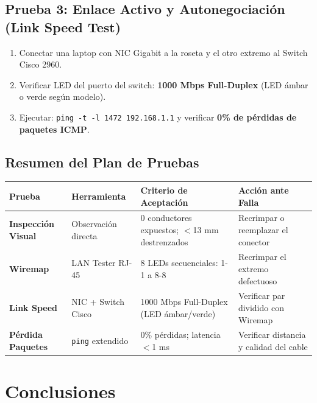 \documentclass[12pt,a4paper]{article}
\begin{document}
\subsection{Prueba 3: Enlace Activo y Autonegociación (Link Speed Test)}
\begin{enumerate}[leftmargin=1.8em,itemsep=3pt]
  \item Conectar una laptop con NIC Gigabit a la roseta y el otro extremo al Switch Cisco 2960.
  \item Verificar LED del puerto del switch: \textbf{1000 Mbps Full-Duplex} (LED ámbar o verde según modelo).
  \item Ejecutar: \texttt{ping -t -l 1472 192.168.1.1} y verificar \textbf{0\% de pérdidas de paquetes ICMP}.
\end{enumerate}

\subsection{Resumen del Plan de Pruebas}

\begin{tabularx}{\textwidth}{>{\bfseries\small}p{2.3cm}>{\small}p{2.8cm}>{\small}p{3cm}>{\small}X}
  \toprule
  \rowcolor{colorPrincipal}
  \color{white}Prueba&\color{white}Herramienta&\color{white}Criterio de Aceptación&\color{white}Acción ante Falla\\
  \midrule
  Inspección Visual & Observación directa & 0 conductores expuestos; $<$13 mm destrenzados & Recrimpar o reemplazar el conector \\
  Wiremap           & LAN Tester RJ-45    & 8 LEDs secuenciales: 1-1 a 8-8 & Recrimpar el extremo defectuoso \\
  Link Speed        & NIC + Switch Cisco  & 1000 Mbps Full-Duplex (LED ámbar/verde) & Verificar par dividido con Wiremap \\
  Pérdida Paquetes  & \texttt{ping} extendido & 0\% pérdidas; latencia $<$1 ms & Verificar distancia y calidad del cable \\
  \bottomrule
\end{tabularx}

\section{Conclusiones}
\end{document}
